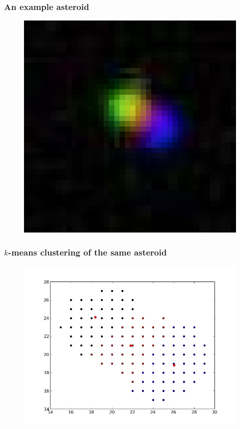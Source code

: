 \documentclass{beamer}
\begin{document}
\begin{frame}
    \frametitle{An example asteroid}
    \begin{figure}
        \centering
        \includegraphics[height=0.8\paperheight]{18364_large.jpg}
    \end{figure}
\end{frame}

\begin{frame}
    \frametitle{$k$-means clustering of the same asteroid}
    \begin{figure}
        \centering
        \includegraphics[height=0.8\paperheight]{clust-18364.png}
    \end{figure}
\end{frame}
\end{document}

